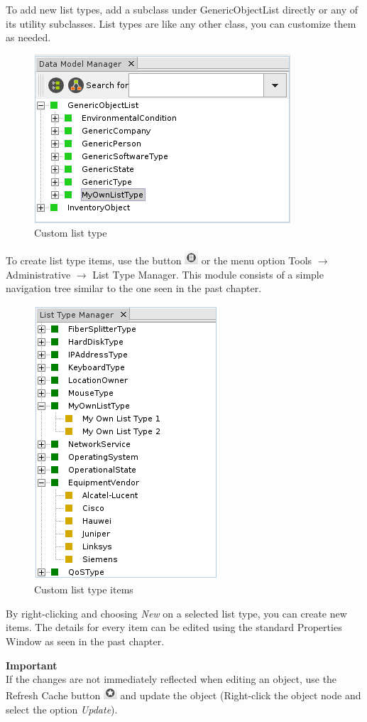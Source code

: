 \documentclass[a4paper]{article}
\begin{document}
	To add new list types, add a subclass under GenericObjectList directly or any of its utility subclasses. List types are like any other class, you can customize them as needed.
	\begin{figure}[h!]
		\centering
		\includegraphics[width=0.5\linewidth]{img/list_type_own_type.png}
		\caption{Custom list type}
		\label{fig:list_type_own_type}
	\end{figure}
	 To create list type items, use the button \includegraphics[width=0.5cm]{img/icon_list_type_manager.png} or the menu option Tools $\rightarrow$ Administrative $\rightarrow$ List Type Manager. This module consists of a simple navigation tree similar to the one seen in the past chapter.
	 \begin{figure}[h!]
	 	\centering
	 	\includegraphics[width=0.3\linewidth]{img/list_type_list_type_items.png}
	 	\caption{Custom list type items}
	 	\label{fig:list_type_list_type_items}
	 \end{figure}
	 
	 By right-clicking and choosing \textit{New} on a selected list type, you can create new items. The details for every item can be edited using the standard Properties Window as seen in the past chapter. 
	 \newpage
	 \begin{framed} {\large \textbf{Important}}\\
	 	If the changes are not immediately reflected when editing an object, use the Refresh Cache button  \includegraphics[width=0.5cm]{img/icon_refresh_cache.png} and update the object (Right-click the object node and select the option \textit{Update}).
	 \end{framed}
	 
\end{document}
